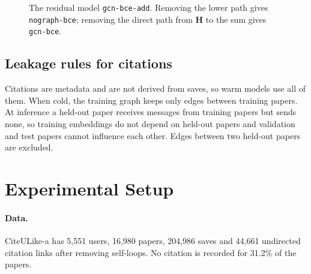 \documentclass[10pt]{article}
\begin{document}
\begin{figure}[t]
\centering
{}
\caption{The residual model \texttt{gcn-bce-add}. Removing the lower path gives \texttt{nograph-bce}; removing the direct path from $\mathbf{H}$ to the sum gives \texttt{gcn-bce}.}
\label{fig:architecture}
\end{figure}

\subsection{Leakage rules for citations}
Citations are metadata and are not derived from saves, so warm models use all of them. When cold, the training graph keeps only edges between training papers. At inference a held-out paper receives messages from training papers but sends none, so training embeddings do not depend on held-out papers and validation and test papers cannot influence each other. Edges between two held-out papers are excluded.

\section{Experimental Setup}
\paragraph{Data.} CiteULike-a has 5,551 users, 16,980 papers, 204,986 saves and 44,661 undirected citation links after removing self-loops. No citation is recorded for 31.2\% of the papers.
\end{document}
